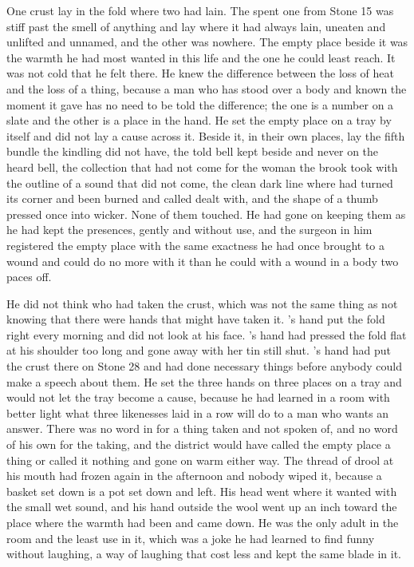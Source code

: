 One crust lay in the fold where two had lain. The spent one from Stone 15 was stiff past the smell of anything and lay where it had always lain, uneaten and unlifted and unnamed, and the other was nowhere. The empty place beside it was the warmth he had most wanted in this life and the one he could least reach. It was not cold that he felt there. He knew the difference between the loss of heat and the loss of a thing, because a man who has stood over a body and known the moment it gave has no need to be told the difference; the one is a number on a slate and the other is a place in the hand. He set the empty place on a tray by itself and did not lay a cause across it. Beside it, in their own places, lay the fifth bundle the kindling did not have, the told bell kept beside and never on the heard bell, the collection that had not come for the woman the brook took with the outline of a sound that did not come, the clean dark line where  had turned its corner and been burned and called dealt with, and the shape of a thumb pressed once into wicker. None of them touched. He had gone on keeping them as he had kept the presences, gently and without use, and the surgeon in him registered the empty place with the same exactness he had once brought to a wound and could do no more with it than he could with a wound in a body two paces off.

He did not think who had taken the crust, which was not the same thing as not knowing that there were hands that might have taken it. 's hand put the fold right every morning and did not look at his face. 's hand had pressed the fold flat at his shoulder too long and gone away with her tin still shut. 's hand had put the crust there on Stone 28 and had done necessary things before anybody could make a speech about them. He set the three hands on three places on a tray and would not let the tray become a cause, because he had learned in a room with better light what three likenesses laid in a row will do to a man who wants an answer. There was no word in  for a thing taken and not spoken of, and no word of his own for the taking, and the district would have called the empty place a thing or called it nothing and gone on warm either way. The thread of drool at his mouth had frozen again in the afternoon and nobody wiped it, because a basket set down is a pot set down and left. His head went where it wanted with the small wet sound, and his hand outside the wool went up an inch toward the place where the warmth had been and came down. He was the only adult in the room and the least use in it, which was a joke he had learned to find funny without laughing, a way of laughing that cost less and kept the same blade in it.

